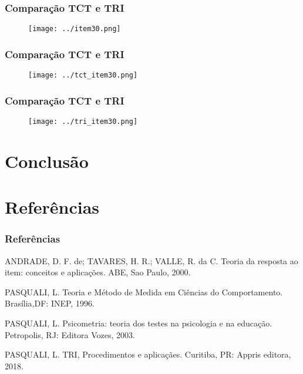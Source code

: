 \documentclass{beamer}
\begin{document}
\begin{frame}
	
	\frametitle{Comparação TCT e TRI}
	\begin{figure}
		\texttt{[image: ../item30.png]}
	\end{figure}
	
\end{frame}	


\begin{frame}
	
	\frametitle{Comparação TCT e TRI}
	\begin{figure}
		\texttt{[image: ../tct\_item30.png]}
	\end{figure}
	
\end{frame}	

\begin{frame}
	
	\frametitle{Comparação TCT e TRI}
	\begin{figure}
		\texttt{[image: ../tri\_item30.png]}
	\end{figure}
	
\end{frame}	

	
	\section{Conclusão}
	
	\section{Referências}
	
	
	\begin{frame}
	\frametitle{Referências}
	ANDRADE, D. F. de; TAVARES, H. R.; VALLE, R. da C. Teoria da resposta ao item: conceitos e	aplicações. ABE, Sao Paulo, 2000. \newline	
	
		
	PASQUALI, L. Teoria e Método de Medida em Ciências do Comportamento. Brasília,DF: INEP, 1996.\newline
	
	PASQUALI, L. Psicometria: teoria dos testes na psicologia e na educação. Petropolis, RJ: Editora Vozes, 2003.\newline
	
	PASQUALI, L. TRI, Procedimentos e aplicaçães. Curitiba, PR: Appris editora, 2018.


	\end{frame}
	
	
	

	
\end{document}
